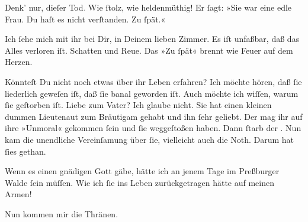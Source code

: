 \pstart
           Denk’ nur, dieſer Tod\textcolor{gray}{.} Wie{ }ſtolz, wie heldenmüthig! Er{ }ſagt: »Sie
               war eine edle Frau. Du haſt es nicht verſtanden. Zu{ }ſpät.«\pend
           
\pstart
           Ich{ }ſehe mich mit ihr bei Dir, in Deinem lieben {\pb}Zimmer. Es iſt unfaßbar, daß das Alles verloren iſt. Schatten und Reue. Das »Zu{ }ſpät« brennt wie Feuer auf dem Herzen.\pend
           
\pstart
           Könnteſt Du nicht noch etwas über ihr Leben erfahren? Ich möchte hören, daß{ }ſie liederlich geweſen iſt, daß{ }ſie banal geworden iſt. Auch möchte ich wiſſen, \strikeout{\textcolor{gray}{×}} warum{ }ſie geſtorben iſt. Liebe zum Vater? Ich glaube nicht. Sie hat einen kleinen dummen Lieutenaut zum Bräutigam gehabt und ihn{ }ſehr
               geliebt. Der mag ihr auf ihre »Unmoral« gekommen{ }ſein und{ }ſie weggeſtoßen {\pb}haben. Dann{ }ſtarb der \label{K_L02628-2v}\label{K_L02628-2}.
               Nun kam die unendliche Vereinſamung über{ }ſie, vielleicht auch die Noth. Darum hat{ }ſies gethan.\pend
           
\pstart
           Wenn es einen gnädigen Gott gäbe, hätte ich an jenem Tage im Preßburger Walde{ }ſein müſſen. Wie ich{ }ſie ins Leben
               zurückgetragen hätte auf meinen Armen!\pend
           
\pstart
           Nun kommen mir die Thränen.\pend
           
